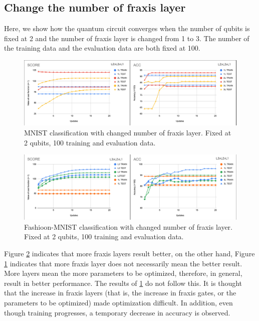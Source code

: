\subsection{Change the number of fraxis layer}
Here, we show how the quantum circuit converges when the number of qubits is fixed at 2 and the number of fraxis layer is changed from 1 to 3. The number of the training data and the evaluation data are both fixed at 100. 

\begin{figure}[H]
    \centering
    \includegraphics[keepaspectratio, scale=0.54]{experiment/figure/MNIST_layer_change.png}
    \caption{MNIST classification with changed number of fraxis layer. Fixed at 2 qubits, 100 training and evaluation data.}
    \label{fig:MNIST_layer_change}
\end{figure}
\begin{figure}[H]
    \centering
    \includegraphics[keepaspectratio, scale=0.54]{experiment/figure/FMNIST_layer_change.png}
    \caption{Fashioon-MNIST classification with changed number of fraxis layer. Fixed at 2 qubits, 100 training and evaluation data.}
    \label{fig:FMNIST_layer_change}
\end{figure}

\par Figure \ref{fig:FMNIST_layer_change} indicates that more fraxis layers result better, on the other hand, Figure \ref{fig:MNIST_layer_change} indicates that more fraxis layer does not necessarily mean the better result. More layers mean the more parameters to be optimized, therefore, in general, result in better performance. The results of \ref{fig:MNIST_layer_change} do not follow this. It is thought that the increase in fraxis layers (that is, the increase in fraxis gates, or the parameters to be optimized) made optimization difficult. In addition, even though training progresses, a temporary decrease in accuracy is observed.\\

